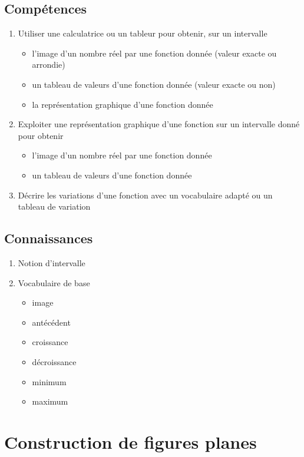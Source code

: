 \documentclass[12pt,a4paper]{article}
\begin{document}
\subsection*{Compétences}
\begin{enumerate}
	\item Utiliser une calculatrice ou un tableur pour obtenir, sur un intervalle
	\begin{itemize}
		\item l'image d'un nombre réel par une fonction donnée (valeur exacte ou arrondie)
		\item un tableau de valeurs d'une fonction donnée (valeur exacte ou non)
		\item la représentation graphique d'une fonction donnée
	\end{itemize}
	\item Exploiter une représentation graphique d'une fonction sur un intervalle donné pour obtenir
	\begin{itemize}
		\item l'image d'un nombre réel par une fonction donnée
		\item un tableau de valeurs d'une fonction donnée
	\end{itemize}
	\item Décrire les variations d'une fonction avec un vocabulaire adapté ou un tableau de variation
\end{enumerate}

\subsection*{Connaissances}
\begin{enumerate}
	\item Notion d'intervalle
	\item Vocabulaire de base
	\begin{itemize}
		\item image
		\item antécédent 
		\item croissance
		\item décroissance
		\item minimum
		\item maximum
	\end{itemize}
	
\end{enumerate}


\section{Construction de figures planes}
\end{document}
